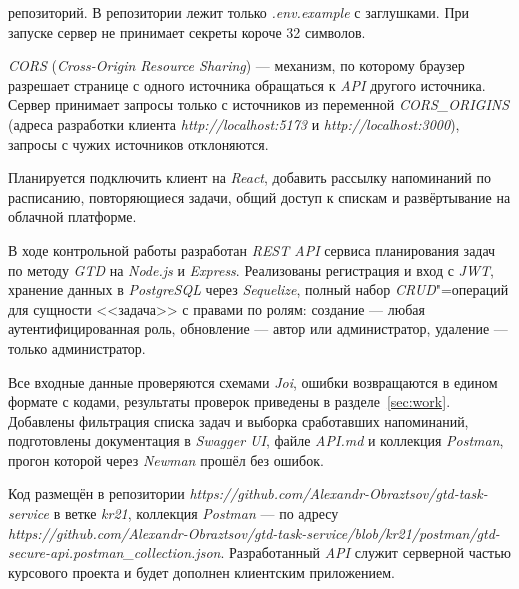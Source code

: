 \documentclass{stp}
\newcommand{\en}[1]{\textit{#1}}
\begin{document}
\begin{stpnum}
    репозиторий. В репозитории лежит только \en{.env.example} с
    заглушками. При запуске сервер не принимает секреты короче 32
    символов.
  \item \en{CORS} (\en{Cross-Origin Resource Sharing}) --- механизм, по
    которому браузер разрешает странице с одного источника обращаться к
    \en{API} другого источника. Сервер принимает запросы только с
    источников из переменной \en{CORS\_ORIGINS} (адреса разработки
    клиента \en{http://localhost:5173} и \en{http://localhost:3000}),
    запросы с чужих источников отклоняются.
  \item Планируется подключить клиент на \en{React}, добавить рассылку
    напоминаний по расписанию, повторяющиеся задачи, общий доступ к
    спискам и развёртывание на облачной платформе.
\end{stpnum}


В ходе контрольной работы разработан \en{REST API} сервиса планирования
задач по методу \en{GTD} на \en{Node.js} и \en{Express}. Реализованы
регистрация и вход с \en{JWT}, хранение данных в \en{PostgreSQL} через
\en{Sequelize}, полный набор \en{CRUD}"=операций для сущности <<задача>>
с правами по ролям: создание --- любая аутентифицированная роль, обновление
--- автор или администратор, удаление --- только администратор.

Все входные данные проверяются схемами \en{Joi}, ошибки возвращаются в
едином формате с кодами, результаты проверок приведены в
разделе~\ref{sec:work}. Добавлены фильтрация списка задач и выборка
сработавших напоминаний, подготовлены документация в \en{Swagger UI},
файле \en{API.md} и коллекция \en{Postman}, прогон которой через
\en{Newman} прошёл без ошибок.

Код размещён в репозитории
\en{https://github.com/\allowbreak{}Alexandr-Obraztsov/\allowbreak{}gtd-task-service}
в ветке \en{kr21}, коллекция \en{Postman} --- по адресу
\en{https://github.com/\allowbreak{}Alexandr-Obraztsov/\allowbreak{}gtd-task-service/\allowbreak{}blob/\allowbreak{}kr21/\allowbreak{}postman/\allowbreak{}gtd-secure-api.postman\_collection.json}.
Разработанный \en{API} служит серверной частью курсового проекта и будет
дополнен клиентским приложением.
\end{document}
